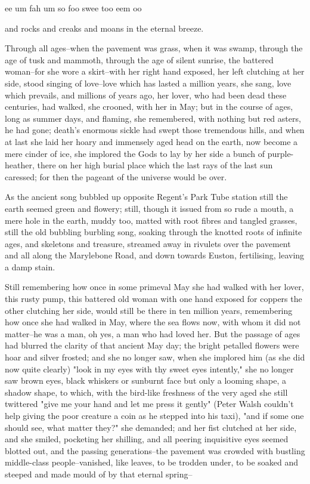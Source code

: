\documentclass[lang=cn,10pt]{elegantbook}
\begin{document}
     ee um fah um so
     foo swee too eem oo


and rocks and creaks and moans in the eternal breeze.

Through all ages--when the pavement was grass, when it was swamp,
through the age of tusk and mammoth, through the age of silent
sunrise, the battered woman--for she wore a skirt--with her right
hand exposed, her left clutching at her side, stood singing of
love--love which has lasted a million years, she sang, love which
prevails, and millions of years ago, her lover, who had been dead
these centuries, had walked, she crooned, with her in May; but in
the course of ages, long as summer days, and flaming, she
remembered, with nothing but red asters, he had gone; death's
enormous sickle had swept those tremendous hills, and when at last
she laid her hoary and immensely aged head on the earth, now become
a mere cinder of ice, she implored the Gods to lay by her side a
bunch of purple-heather, there on her high burial place which the
last rays of the last sun caressed; for then the pageant of the
universe would be over.

As the ancient song bubbled up opposite Regent's Park Tube station
still the earth seemed green and flowery; still, though it issued
from so rude a mouth, a mere hole in the earth, muddy too, matted
with root fibres and tangled grasses, still the old bubbling
burbling song, soaking through the knotted roots of infinite ages,
and skeletons and treasure, streamed away in rivulets over the
pavement and all along the Marylebone Road, and down towards
Euston, fertilising, leaving a damp stain.

Still remembering how once in some primeval May she had walked with
her lover, this rusty pump, this battered old woman with one hand
exposed for coppers the other clutching her side, would still be
there in ten million years, remembering how once she had walked in
May, where the sea flows now, with whom it did not matter--he was a
man, oh yes, a man who had loved her.  But the passage of ages had
blurred the clarity of that ancient May day; the bright petalled
flowers were hoar and silver frosted; and she no longer saw, when
she implored him (as she did now quite clearly) "look in my eyes
with thy sweet eyes intently," she no longer saw brown eyes, black
whiskers or sunburnt face but only a looming shape, a shadow shape,
to which, with the bird-like freshness of the very aged she still
twittered "give me your hand and let me press it gently" (Peter
Walsh couldn't help giving the poor creature a coin as he stepped
into his taxi), "and if some one should see, what matter they?" she
demanded; and her fist clutched at her side, and she smiled,
pocketing her shilling, and all peering inquisitive eyes seemed
blotted out, and the passing generations--the pavement was crowded
with bustling middle-class people--vanished, like leaves, to be
trodden under, to be soaked and steeped and made mould of by that
eternal spring--
\end{document}
